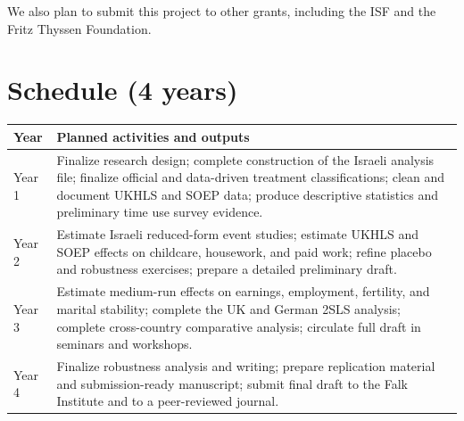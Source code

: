 \documentclass[12pt]{article}
\begin{document}
We also plan to submit this project to other grants, including the ISF and the Fritz Thyssen Foundation.

\section{Schedule (4 years)}

\begin{center}
\begin{tabularx}{0.98\textwidth}{>{\raggedright\arraybackslash}p{1.7cm} X}
\toprule
\textbf{Year} & \textbf{Planned activities and outputs} \\
\midrule
Year 1 & Finalize research design; complete construction of the Israeli analysis file; finalize official and data-driven treatment classifications; clean and document UKHLS and SOEP data; produce descriptive statistics and preliminary time use survey evidence. \\
Year 2 & Estimate Israeli reduced-form event studies; estimate UKHLS and SOEP effects on childcare, housework, and paid work; refine placebo and robustness exercises; prepare a detailed preliminary draft. \\
Year 3 & Estimate medium-run effects on earnings, employment, fertility, and marital stability; complete the UK and German 2SLS analysis; complete cross-country comparative analysis; circulate full draft in seminars and workshops. \\
Year 4 & Finalize robustness analysis and writing; prepare replication material and submission-ready manuscript; submit final draft to the Falk Institute and to a peer-reviewed journal. \\
\bottomrule
\end{tabularx}
\end{center}

\renewcommand{\refname}{References}


\end{document}
